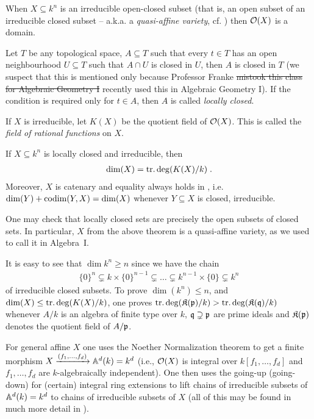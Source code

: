 \documentclass[a4paper,parskip=half,numbers=enddot, DIV=12, headheight=30pt]{scrreprt}
\begin{document}
\begin{rem}
	When $X\subseteq k^n$ is an irreducible open-closed subset (that is, an open subset of an irreducible closed subset -- a.k.a. a \emph{quasi-affine variety}, cf. \cite[Definition~2.2.1]{alg1}) then $\mathcal{O}(X)$ is a domain. 
\end{rem}
\begin{rem}
	Let $T$ be any topological space, $A\subseteq T$ such that every $t\in T$ has an open neighbourhood $U\subseteq T$ such that $A\cap U$ is closed in $U$, then $A$ is closed in $T$ (we suspect that this is mentioned only because Professor Franke \sout{mistook this class for Algebraic Geometry I} recently used this in Algebraic Geometry I). If the condition is required only for $t\in A$, then $A$ is called \emph{locally closed}.
\end{rem}
If $X$ is irreducible, let $K(X)$ be the quotient field of $\mathcal{O}(X)$. This is called the \emph{field of rational functions} on $X$.
\begin{thm}
	If $X\subseteq k^n$ is locally closed and irreducible, then
	\begin{align*}
	\dim(X) = \operatorname{tr.deg} (K(X)/k)\;.
	\end{align*}
	Moreover, $X$ is catenary and equality always holds in , i.e.\ $\dim (Y) +\operatorname{codim}(Y,X) = \dim (X)$ whenever $Y\subseteq X$ is closed, irreducible.
\end{thm}
One may check that locally closed sets are precisely the open subsets of closed sets. In particular, $X$ from the above theorem is a quasi-affine variety, as we used to call it in Algebra~I.
\begin{rem}
	It is easy to see that $\dim k^n \geq n$ since we have the chain
	\begin{align*}
	\{0\}^n \subsetneq k\times\{0\}^{n-1} \subsetneq\ldots\subsetneq k^{n-1}\times\{0\} \subsetneq k^n
	\end{align*} of irreducible closed subsets. To prove $\dim(k^n) \leq n$, and $\dim (X) \leq\operatorname{tr.deg}(K(X)/k)$, one proves $\operatorname{tr.deg}(\mathfrak{K}(\mathfrak{p})/k) > \operatorname{tr.deg}(\mathfrak{K}(\mathfrak{q})/k)$ whenever $A/k$ is an algebra of finite type over $k$, $\mathfrak{q}\supsetneq \mathfrak{p}$ are prime ideals and $\mathfrak{K}(\mathfrak{p})$ denotes the quotient field of $A/\mathfrak{p}$. 
	
	For general affine $X$ one uses the Noether Normalization theorem to get a finite morphism $X\xrightarrow{(f_1,\ldots,f_d)} \mathbb{A}^d(k)=k^d$ (i.e., $\mathcal{O}(X)$ is integral over $k[f_1,\ldots,f_d]$ and $f_1,\ldots,f_d$ are $k$-algebraically independent). One then uses the going-up (going-down) for (certain) integral ring extensions to lift chains of irreducible subsets of $\mathbb{A}^d(k)=k^d$ to chains of irreducible subsets of $X$ (all of this may be found in much more detail in \cite[Section~2.4-2.6]{alg1}).
\end{rem}
\end{document}
